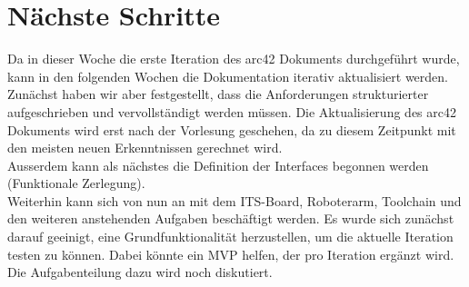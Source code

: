 \documentclass{article}
\begin{document}
\section{Nächste Schritte}
Da in dieser Woche die erste Iteration des arc42 Dokuments durchgeführt wurde, kann in den folgenden Wochen die Dokumentation iterativ aktualisiert werden. Zunächst haben wir aber festgestellt, dass die Anforderungen strukturierter aufgeschrieben und vervollständigt werden müssen. Die Aktualisierung des arc42 Dokuments wird erst nach der Vorlesung geschehen, da zu diesem Zeitpunkt mit den meisten neuen Erkenntnissen gerechnet wird. \\
Ausserdem kann als nächstes die Definition der Interfaces begonnen werden (Funktionale Zerlegung). \\ 
Weiterhin kann sich von nun an mit dem ITS-Board, Roboterarm, Toolchain und den weiteren anstehenden Aufgaben beschäftigt werden. Es wurde sich zunächst darauf geeinigt, eine Grundfunktionalität herzustellen, um die aktuelle Iteration testen zu können. Dabei könnte ein MVP helfen, der pro Iteration ergänzt wird. Die Aufgabenteilung dazu wird noch diskutiert.
\end{document}
